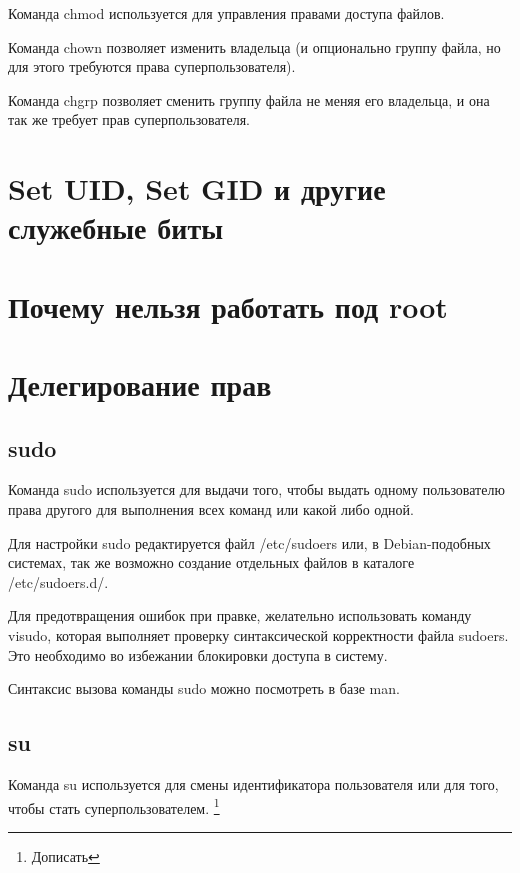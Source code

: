 Команда chmod используется для управления правами доступа файлов.

Команда chown позволяет изменить владельца (и опционально группу файла, но для этого требуются права суперпользователя).

Команда chgrp позволяет сменить группу файла не меняя его владельца, и она так же требует прав суперпользователя.
\section{Set UID, Set GID и другие служебные биты}
\section{Почему нельзя работать под root}
\section{Делегирование прав}
\subsection{sudo}
Команда sudo используется для выдачи того, чтобы выдать одному пользователю права другого для выполнения всех команд или какой либо одной.

Для настройки sudo редактируется файл /etc/sudoers или, в Debian-подобных системах, так же возможно создание отдельных файлов в каталоге /etc/sudoers.d/.

Для предотвращения ошибок при правке, желательно использовать команду visudo, которая выполняет проверку синтаксической корректности файла sudoers. Это необходимо во избежании блокировки доступа в систему.

Синтаксис вызова команды sudo можно посмотреть в базе man.
\subsection{su}
Команда su используется для смены идентификатора пользователя или для того, чтобы стать суперпользователем.
\footnote{Дописать}